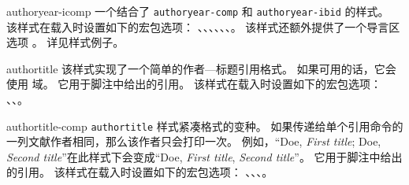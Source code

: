 \begin{marglist}
\item[authoryear-icomp]
一个结合了 \texttt{authoryear-comp} 和 \texttt{authoryear-ibid} 的样式。
该样式在载入时设置如下的宏包选项：
、、、、、、。
该样式还额外提供了一个导言区选项 。
详见样式例子。

\item[authortitle]
该样式实现了一个简单的作者---标题引用格式。
如果可用的话，它会使用  域。
它用于脚注中给出的引用。
该样式在载入时设置如下的宏包选项：
、、。

\item[authortitle-comp]
\texttt{authortitle} 样式紧凑格式的变种。
如果传递给单个引用命令的一列文献作者相同，那么该作者只会打印一次。
例如，“Doe, \emph{First title}; Doe, \emph{Second title}”在此样式下会变成“Doe, \emph{First title}, \emph{Second title}”。
它用于脚注中给出的引用。
该样式在载入时设置如下的宏包选项：
、、、。


\end{marglist}
